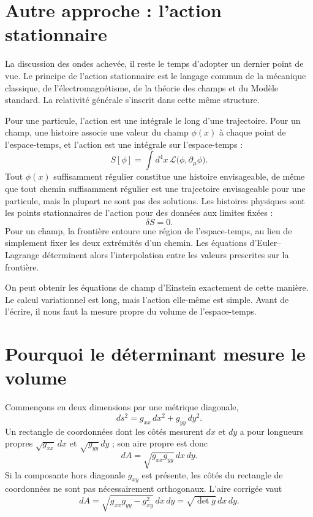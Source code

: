 \section{Autre approche : l’action stationnaire}

La discussion des ondes achevée, il reste le temps d’adopter un dernier point de vue. Le principe de l’action stationnaire est le langage commun de la mécanique classique, de l’électromagnétisme, de la théorie des champs et du Modèle standard. La relativité générale s’inscrit dans cette même structure.

Pour une particule, l’action est une intégrale le long d’une trajectoire. Pour un champ, une histoire associe une valeur du champ \(\phi(x)\) à chaque point de l’espace-temps, et l’action est une intégrale sur l’espace-temps :
\begin{equation}
 S[\phi]
 =\int d^4x\,
 \mathcal L\bigl(\phi,\partial_\mu\phi\bigr).
 \label{eq:field-action}
\end{equation}
Tout \(\phi(x)\) suffisamment régulier constitue une histoire envisageable, de même que tout chemin suffisamment régulier est une trajectoire envisageable pour une particule, mais la plupart ne sont pas des solutions. Les histoires physiques sont les points stationnaires de l’action pour des données aux limites fixées :
\begin{equation}
 \delta S=0.
 \label{eq:stationary-action}
\end{equation}
Pour un champ, la frontière entoure une région de l’espace-temps, au lieu de simplement fixer les deux extrémités d’un chemin. Les équations d’Euler--Lagrange déterminent alors l’interpolation entre les valeurs prescrites sur la frontière.

On peut obtenir les équations de champ d’Einstein exactement de cette manière. Le calcul variationnel est long, mais l’action elle-même est simple. Avant de l’écrire, il nous faut la mesure propre du volume de l’espace-temps.

\section{Pourquoi le déterminant mesure le volume}

Commençons en deux dimensions par une métrique diagonale,
\begin{equation}
 ds^2=g_{xx}\,dx^2+g_{yy}\,dy^2.
\end{equation}
Un rectangle de coordonnées dont les côtés mesurent \(dx\) et \(dy\) a pour longueurs propres
\(\sqrt{g_{xx}}\,dx\) et \(\sqrt{g_{yy}}\,dy\) ; son aire propre est donc
\begin{equation}
 dA
 =\sqrt{g_{xx}g_{yy}}\,dx\,dy.
\end{equation}
Si la composante hors diagonale \(g_{xy}\) est présente, les côtés du rectangle de coordonnées ne sont pas nécessairement orthogonaux. L’aire corrigée vaut
\begin{equation}
 dA
 =\sqrt{g_{xx}g_{yy}-g_{xy}^2}\,dx\,dy
 =\sqrt{\det g}\,dx\,dy.
 \label{eq:area-determinant}
\end{equation}

